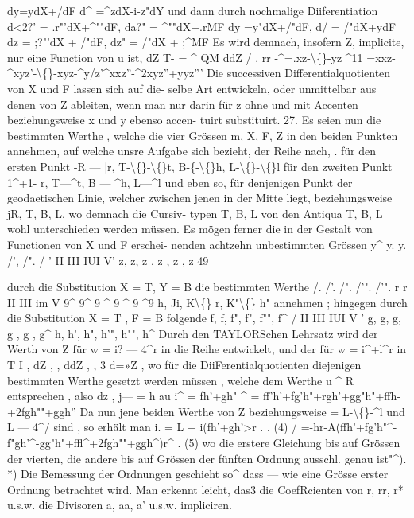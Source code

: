 \documentclass[12pt,a4paper]{article}
\begin{document}
dy=ydX+/dF d\^{}  =\^{}zdX-i-z"dY und  dann  durch  nochmalige  Diiferentiation d<2?'  =  .r"'dX+\^{}""dF,         da?"  =  \^{}""dX+.rMF dy  =y"dX+/"dF,         d/  =  /"dX+ydF dz  =  ;?"'dX  +  /"dF,         dz"  =  /"dX  +  ;\^{}MF Es  wird  demnach,  insofern  Z,  implicite,  nur  eine  Function  von  u  ist, dZ T-      =  \^{} QM ddZ  /    .  rr -\^{}=.xz-\textbackslash\{\}-yz \^{}11  =xxz-\^{}xyz'-\textbackslash\{\}-xyz-\^{}y/z'\^{}xxz''-\^{}2xyz''+yyz''' Die  successiven  Differentialquotienten  von  X  und  F  lassen  sich  auf  die- selbe Art  entwickeln,  oder  unmittelbar  aus  denen  von  Z  ableiten,  wenn  man nur  darin  für  z  ohne  und  mit  Accenten  beziehungsweise  x  und  y  ebenso  accen- tuirt  substituirt. 27. Es  seien  nun  die  bestimmten  Werthe ,  welche  die  vier  Grössen    m,  X,  F,  Z in  den  beiden  Punkten  annehmen,  auf  welche  unsre  Aufgabe  sich  bezieht,  der Reihe  nach,  . für  den  ersten  Punkt      -R  --- |r,       T-\textbackslash\{\}-\textbackslash\{\}t,      B-\{-\textbackslash\{\}h,      L-\textbackslash\{\}-\textbackslash\{\}l für  den  zweiten  Punkt   1\^{}+1- r,       T---\^{}t,      B  ---  \^{}h,      L---\^{}l und  eben  so,  für  denjenigen  Punkt  der  geodaetischen  Linie,  welcher  zwischen jenen  in  der  Mitte  liegt,  beziehungsweise  jR,  T,  B,  L,  wo  demnach  die  Cursiv- typen  T,  B,  L  von  den  Antiqua  T,  B,  L  wohl  unterschieden  werden  müssen. Es  mögen  ferner  die  in  der  Gestalt  von  Functionen  von  X  und  F  erschei- nenden achtzehn  unbestimmten  Grössen y\^{}  y.  y.  /',  /".  / '  II  III  IUI  V' z,   z,  z  ,   z  ,    z   ,   z 49

durch  die  Substitution    X  =  T,    Y  =  B   die  bestimmten  Werthe /.  /'.  /".  /'".  /'".  r r  II  III  im  V 9\^{}  9\^{}  9  \^{}  9  \^{}  9   \^{}9 h,  Ji,  K\textbackslash\{\}   r,   K"\textbackslash\{\}   h" annehmen ;  hingegen  durch  die  Substitution    X  =  T ,    F  =  B   folgende f,    f,   f",    f",   f"",  f\^{} /  II  III  IUI  V '  g,      g,     g,      g     ,      g      ,     g\^{} h,     h',     h",     h'",     h"",     h\^{} Durch  den  TAYLORSchen  Lehrsatz  wird  der  Werth  von   Z  für   w  =  i?  --- 4\^{}r    in die  Reihe entwickelt,  und  der  für   w  =  i\^{}+l\^{}r   in T     I    ,       dZ    ,    ,  ddZ   ,      ,      3    d=»Z    , wo  für  die  DiiFerentialquotienten  diejenigen  bestimmten  Werthe  gesetzt  werden müssen ,  welche  dem  Werthe   u  \^{}  R   entsprechen ,  also dz         , j---    =  h au i\^{}  =  fh'+gh" \^{}  =  ff'h'+fg'h"+rgh'+gg"h"+ffh-+2fgh""+ggh'' Da  nun  jene  beiden  Werthe  von   Z  beziehungsweise    =  L-\textbackslash\{\}-\^{}l   und    L  ---  4\^{}/ sind ,  so  erhält  man i.  =  L  +  i(fh'+gh'>r     .      .    (4) /  =-hr-A(ffh'+fg'h"\^{}-f"gh'\^{}-gg"h"+ffl\^{}+2fgh""+ggh\^{})r\^{} .  (5) wo  die  erstere  Gleichung  bis  auf  Grössen  der  vierten,  die  andere  bis  auf  Grössen der  fünften  Ordnung  ausschl.  genau  ist"\^{}). *)  Die  Bemessung  der  Ordnungen  geschieht  so\^{}  dass  ---  wie  eine  Grösse  erster  Ordnung  betrachtet wird.  Man  erkennt  leicht,  das3  die  CoefRcienten  von  r,  rr,  r*  u.s.w.  die  Divisoren  a,  aa,  a'  u.s.w. impliciren.
\end{document}
